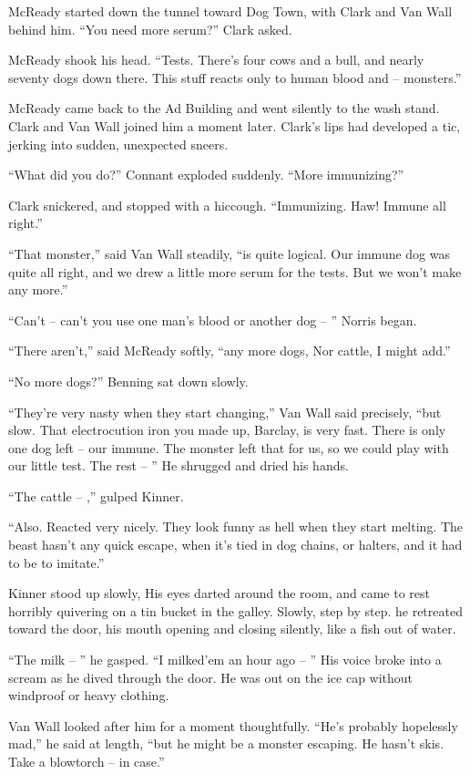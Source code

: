 \documentclass[ebook,oneside,11pt]{memoir}				%
\begin{document}
McReady started down the tunnel toward Dog Town, with Clark and Van Wall behind him. ``You need more serum?'' Clark asked.

McReady shook his head. ``Tests. There's four cows and a bull, and nearly seventy dogs down there. This stuff reacts only to human blood and -- monsters.''

McReady came back to the Ad Building and went silently to the wash stand. Clark and Van Wall joined him a moment later. Clark's lips had developed a tic, jerking into sudden, unexpected sneers.

``What did you do?'' Connant exploded suddenly. ``More immunizing?''

Clark snickered, and stopped with a hiccough. ``Immunizing. Haw! Immune all right.''

``That monster,'' said Van Wall steadily, ``is quite logical. Our immune dog was quite all right, and we drew a little more serum for the tests. But we won't make any more.''

``Can't -- can't you use one man's blood or another dog -- '' Norris began.

``There aren't,'' said McReady softly, ``any more dogs, Nor cattle, I might add.''

``No more dogs?'' Benning sat down slowly.

``They're very nasty when they start changing,'' Van Wall said precisely, ``but slow. That electrocution iron you made up, Barclay, is very fast. There is only one dog left -- our immune. The monster left that for us, so we could play with our little test. The rest -- '' He shrugged and dried his hands.

``The cattle -- ,'' gulped Kinner.

``Also. Reacted very nicely. They look funny as hell when they start melting. The beast hasn't any quick escape, when it's tied in dog chains, or halters, and it had to be to imitate.''

Kinner stood up slowly, His eyes darted around the room, and came to rest horribly quivering on a tin bucket in the galley. Slowly, step by step. he retreated toward the door, his mouth opening and closing silently, like a fish out of water.

``The milk -- '' he gasped. ``I milked'em an hour ago -- '' His voice broke into a scream as he dived through the door. He was out on the ice cap without windproof or heavy clothing.

Van Wall looked after him for a moment thoughtfully. ``He's probably hopelessly mad,'' he said at length, ``but he might be a monster escaping. He hasn't skis. Take a blowtorch -- in case.''
\end{document}
